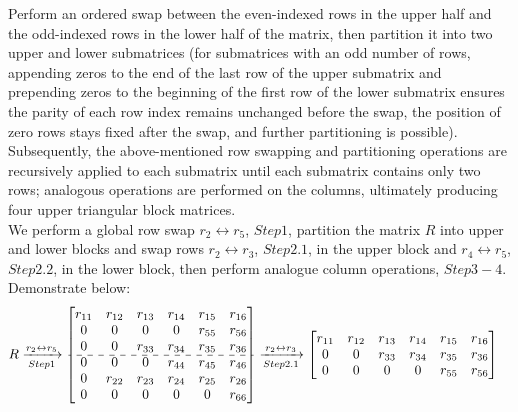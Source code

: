 \documentclass{book}
\theoremstyle{remark}
\begin{document}
\begin{multicols}{2}
\iffalse 
{\color{red}Perform an ordered swap between the even-indexed rows in the upper half and the odd-indexed rows in the lower half of the matrix, then partition it into two upper and lower submatrices (for submatrices with an odd number of rows, appending zeros to the end of the last row of the upper submatrix and prepending zeros to the beginning of the first row of the lower submatrix ensures the parity of each row index remains unchanged before the swap, the position of zero rows stays fixed after the swap, and further partitioning is possible). Subsequently, the above-mentioned row swapping and partitioning operations are recursively applied to each submatrix until each submatrix contains only two rows; analogous operations are performed on the columns, ultimately producing four upper triangular block matrices.}\\
We perform a global row swap \( r_{2} \leftrightarrow r_{5} \), $Step1$, partition the matrix $R$ into upper and lower blocks and swap rows \( r_{2} \leftrightarrow r_{3} \), $Step2.1$, in the upper block and \( r_{4} \leftrightarrow r_{5} \), $Step2.2$, in the lower block, then perform analogue column operations, $Step3-4$. Demonstrate below:
\begin{align*}
R
& \xrightarrow[Step1]{r_{2} \leftrightarrow r_{5}}
\begin{bmatrix}
 r_{11} & r_{12} & r_{13} & r_{14} & r_{15} & r_{16}\\
 0      & 0      & 0      & 0      & r_{55} & r_{56}\\
 0      & 0      & r_{33} & r_{34} & r_{35} & r_{36}\\
 \cdashline{1-6}
 0      & 0      & 0 & r_{44} & r_{45} & r_{46}\\
 0 & r_{22} & r_{23} & r_{24} & r_{25} & r_{26}\\
 0      & 0      & 0      & 0      & 0 & r_{66}\\
\end{bmatrix}
\xrightarrow[Step2.1]{r_{2} \leftrightarrow r_{3}}
\begin{bmatrix}
 r_{11} & r_{12} & r_{13} & r_{14} & r_{15} & r_{16}\\
 0      & 0      & r_{33} & r_{34} & r_{35} & r_{36}\\
 0      & 0      & 0      & 0      & r_{55} & r_{56}\\

\end{bmatrix}
\end{align*}
\end{multicols}
\end{document}
